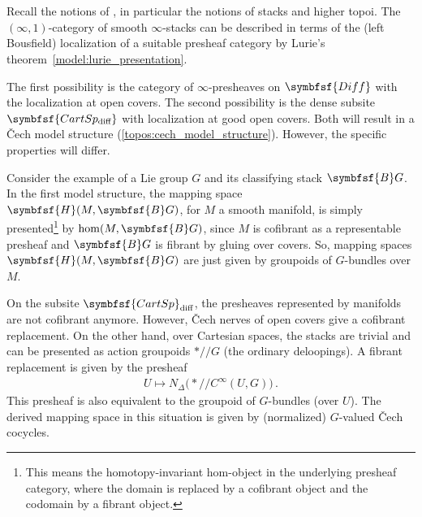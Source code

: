 \section{}

    Recall the notions of , in particular the notions of stacks and higher topoi. The $(\infty,1)$-category of smooth $\infty$-stacks can be described in terms of the (left Bousfield) localization of a suitable presheaf category by Lurie's theorem~\ref{model:lurie_presentation}.

    The first possibility is the category of $\infty$-presheaves on $\symbfsf{Diff}$ with the localization at open covers. The second possibility is the dense subsite $\symbfsf{CartSp_{\text{diff}}}$ with localization at good open covers. Both will result in a \v{C}ech model structure (\cref{topos:cech_model_structure}). However, the specific properties will differ.

    \begin{example}
        Consider the example of a Lie group $G$ and its classifying stack $\symbfsf{B}G$. In the first model structure, the mapping space $\symbfsf{H}(M,\symbfsf{B}G)$, for $M$ a smooth manifold, is simply presented\footnote{This means the homotopy-invariant hom-object in the underlying presheaf category, where the domain is replaced by a cofibrant object and the codomain by a fibrant object.} by $\hom(M,\symbfsf{B}G)$, since $M$ is cofibrant as a representable presheaf and $\symbfsf{B}G$ is fibrant by gluing over covers. So, mapping spaces $\symbfsf{H}(M,\symbfsf{B}G)$ are just given by groupoids of $G$-bundles over $M$.

        On the subsite $\symbfsf{CartSp}_{\text{diff}}$, the presheaves represented by manifolds are not cofibrant anymore. However, \v{C}ech nerves of open covers give a cofibrant replacement. On the other hand, over Cartesian spaces, the stacks are trivial and can be presented as action groupoids $\ast/\!\!/G$ (the ordinary deloopings). A fibrant replacement is given by the presheaf
        \begin{gather}
            U\mapsto N_\Delta\bigl(\ast/\!\!/C^\infty(U,G)\bigr)\,.
        \end{gather}
        This presheaf is also equivalent to the groupoid of $G$-bundles (over $U$). The derived mapping space in this situation is given by (normalized) $G$-valued \v{C}ech cocycles.
    \end{example}


